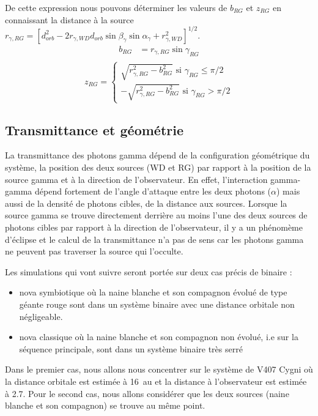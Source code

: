 \documentclass[a4paper,12pt,twoside]{article}
\begin{document}
De cette expression nous pouvons déterminer les valeurs de $b_{RG}$ et $z_{RG}$ en connaissant la distance à la source $r_{\gamma,RG} = \left[d_{orb}^2 - 2 r_{\gamma, WD} d_{orb} \sin\beta_\gamma\sin\alpha_\gamma + r_{\gamma, WD}^2 \right]^{1/2}$.
\begin{align*}
	b_{RG} &= r_{\gamma, RG} \sin\gamma_{RG}\\
\end{align*}
\begin{equation*}
	z_{RG} =
    \left\{
    \begin{array} {c}
    	\sqrt{r_{\gamma, RG}^2 - b_{RG}^2} \text{ si $\gamma_{RG} \leq \pi/2$}\\
        -\sqrt{r_{\gamma, RG}^2 - b_{RG}^2} \text{ si $\gamma_{RG} > \pi/2$}
    \end{array}
    \right.
\end{equation*}
\newpage

\subsection{Transmittance et géométrie}

La transmittance des photons gamma dépend de la configuration géométrique du système, la position des deux sources (WD et RG) par rapport à la position de la source gamma et à la direction de l'observateur. En effet, l'interaction gamma-gamma dépend fortement de l'angle d'attaque entre les deux photons ($\alpha$) mais aussi de la densité de photons cibles, de la distance aux sources. Lorsque la source gamma se trouve directement derrière au moins l'une des deux sources de photons cibles par rapport à la direction de l'observateur, il y a un phénomème d'éclipse et le calcul de la transmittance n'a pas de sens car les photons gamma ne peuvent pas traverser la source qui l'occulte.

Les simulations qui vont suivre seront portée sur deux cas précis de binaire :
\begin{itemize}
\item nova symbiotique où la naine blanche et son compagnon évolué de type géante rouge sont dans un système binaire avec une distance orbitale non négligeable.
\item nova classique où la naine blanche et son compagnon non évolué, i.e sur la séquence principale, sont dans un système binaire très serré
\end{itemize}
Dans le premier cas, nous allons nous concentrer sur le système de V407 Cygni où la distance orbitale est estimée à \SI{16}{\astronomicalunit} et la distance à l'observateur est  estimée à \SI{2.7}{\kpc}. Pour le second cas, nous allons considérer que les deux sources (naine blanche et son compagnon) se trouve au même point.
\end{document}

